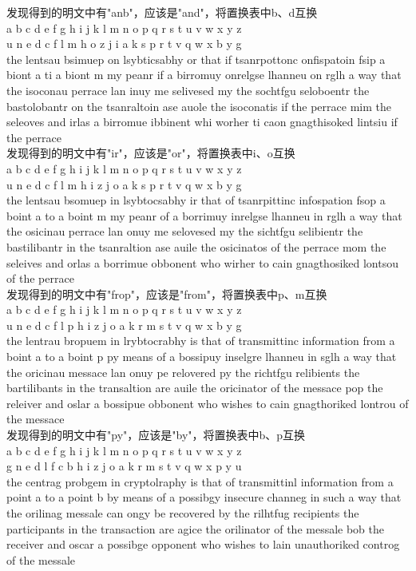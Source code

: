 	发现得到的明文中有"anb"，应该是"and"，将置换表中b、d互换\\
	a b c d e f g h i j k l m n o p q r s t u v w x y z\\
	u n e d c f l m h o z j i a k s p r t v q w x b y g\\
	the lentsau bsimuep on lsybticsabhy or that if tsanrpottonc onfispatoin fsip a biont a ti a biont m my peanr if a birromuy onrelgse lhanneu on rglh a way that the isoconau perrace lan inuy me selivesed my the sochtfgu seloboentr the bastolobantr on the tsanraltoin ase auole the isoconatis if the perrace mim the seleoves and irlas a birromue ibbinent whi worher ti caon gnagthisoked lintsiu if the perrace\\
	
	发现得到的明文中有"ir"，应该是"or"，将置换表中i、o互换\\
	a b c d e f g h i j k l m n o p q r s t u v w x y z\\
	u n e d c f l m h i z j o a k s p r t v q w x b y g\\
	the lentsau bsomuep in lsybtocsabhy ir that of tsanrpittinc infospation fsop a boint a to a boint m my peanr of a borrimuy inrelgse lhanneu in rglh a way that the osicinau perrace lan onuy me selovesed my the sichtfgu selibientr the bastilibantr in the tsanraltion ase auile the osicinatos of the perrace mom the seleives and orlas a borrimue obbonent who wirher to cain gnagthosiked lontsou of the perrace\\
	
	发现得到的明文中有"frop"，应该是"from"，将置换表中p、m互换\\
	a b c d e f g h i j k l m n o p q r s t u v w x y z\\
	u n e d c f l p h i z j o a k r m s t v q w x b y g\\
	the lentrau bropuem in lrybtocrabhy is that of transmittinc information from a boint a to a boint p py means of a bossipuy inselgre lhanneu in sglh a way that the oricinau messace lan onuy pe relovered py the richtfgu relibients the bartilibants in the transaltion are auile the oricinator of the messace pop the releiver and oslar a bossipue obbonent who wishes to cain gnagthoriked lontrou of the messace\\
	
	
	发现得到的明文中有"py"，应该是"by"，将置换表中b、p互换\\
	a b c d e f g h i j k l m n o p q r s t u v w x y z\\
	g n e d l f c b h i z j o a k r m s t v q w x p y u\\
	the centrag probgem in cryptolraphy is that of transmittinl information from a point a to a point b by means of a possibgy insecure channeg in such a way that the orilinag messale can ongy be recovered by the rilhtfug recipients the participants in the transaction are agice the orilinator of the messale bob the receiver and oscar a possibge opponent who wishes to lain unauthoriked controg of the messale\\
	
